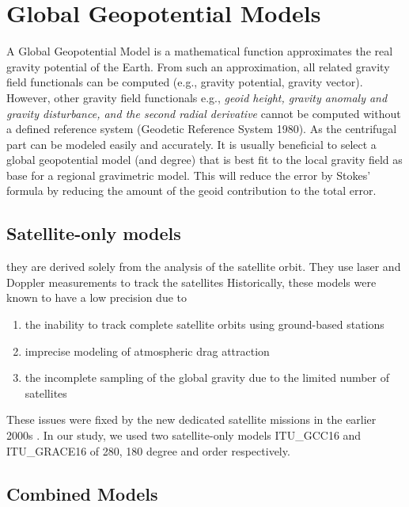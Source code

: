 \section{Global Geopotential Models}

A Global Geopotential Model is a mathematical function approximates the real gravity potential of the Earth. From such an approximation, all related gravity field functionals can be computed (e.g., gravity potential, gravity vector). However, other gravity field functionals e.g., \textit{geoid height, gravity anomaly and gravity disturbance, and the second radial derivative} cannot be computed without a defined reference system (Geodetic Reference System 1980). As the centrifugal part can be modeled easily and accurately. It is usually beneficial to select a global geopotential model (and degree) that is best fit to the local gravity field as base for a regional gravimetric model. This will reduce the error by Stokes' formula by reducing the amount of the geoid contribution to the total error.

\subsection{Satellite-only models} they are derived solely from the analysis of the satellite orbit. They use laser and Doppler measurements to track the satellites \cite{goce_sp123} Historically, these models were known to have a low precision due to

\begin{enumerate}
	\item the inability to track complete satellite orbits using ground-based stations
	\item imprecise modeling of atmospheric drag attraction
	\item the incomplete sampling of the global gravity due to the limited number of satellites
\end{enumerate}
 
 
 These issues were fixed by the new dedicated satellite missions in the earlier 2000s \cite{rummel}. In our study, we used two satellite-only models ITU\_GCC16 and ITU\_GRACE16 of 280, 180 degree and order respectively. 
 
 \subsection{Combined Models}
 
